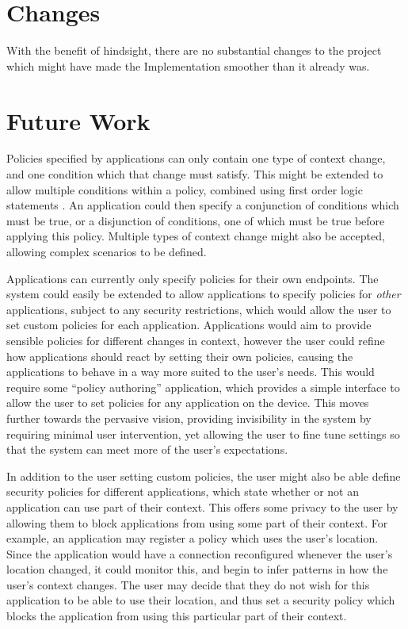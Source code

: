 \documentclass[12pt,twoside,notitlepage]{report}
\begin{document}
\section{Changes}
With the benefit of hindsight, there are no substantial changes to the project which might have made the Implementation smoother than it already was. 

\section{Future Work}

Policies specified by applications can only contain one type of context change, and one condition which that change must satisfy. 
This might be extended to allow multiple conditions within a policy, combined using first order logic statements \cite{ranganathan2003middleware}. 
An application could then specify a conjunction of conditions which must be true, or a disjunction of conditions, one of which must be true before applying this policy. 
Multiple types of context change might also be accepted, allowing complex scenarios to be defined. 

Applications can currently only specify policies for their own endpoints. 
The system could easily be extended to allow applications to specify policies for {\sl other} applications, subject to any security restrictions, which would allow the user to set custom policies for each application. 
Applications would aim to provide sensible policies for different changes in context, however the user could refine how applications should react by setting their own policies, causing the applications to behave in a way more suited to the user's needs. 
This would require some ``policy authoring'' application, which provides a simple interface to allow the user to set policies for any application on the device. 
This moves further towards the pervasive vision, providing invisibility \cite{saha2003pervasive} in the system by requiring minimal user intervention, yet allowing the user to fine tune settings so that the system can meet more of the user's expectations. 

In addition to the user setting custom policies, the user might also be able define security policies for different applications, which state whether or not an application can use part of their context. 
This offers some privacy to the user by allowing them to block applications from using some part of their context. 
For example, an application may register a policy which uses the user's location. 
Since the application would have a connection reconfigured whenever the user's location changed, it could monitor this, and begin to infer patterns in how the user's context changes. 
The user may decide that they do not wish for this application to be able to use their location, and thus set a security policy which blocks the application from using this particular part of their context. 
\end{document}
